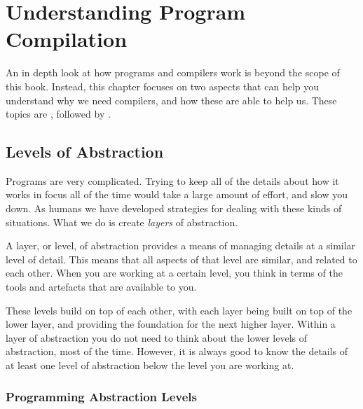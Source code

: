 

\clearpage
\def\pageLang{}
\section{Understanding Program Compilation} %
\label{sec:understanding_program_compilation}

An in depth look at how programs and compilers work is beyond the scope of this book. Instead, this chapter focuses on two aspects that can help you understand why we need compilers, and how these are able to help us. These topics are , followed by .

\subsection{Levels of Abstraction} %
\label{sub:levels_of_abstraction}

Programs are very complicated. Trying to keep all of the details about how it works in focus all of the time would take a large amount of effort, and slow you down. As humans we have developed strategies for dealing with these kinds of situations. What we do is create \emph{layers} of abstraction.

A layer, or level, of abstraction provides a means of managing details at a similar level of detail. This means that all aspects of that level are similar, and related to each other. When you are working at a certain level, you think in terms of the tools and artefacts that are available to you. 

These levels build on top of each other, with each layer being built on top of the lower layer, and providing the foundation for the next higher layer. Within a layer of abstraction you do not need to think about the lower levels of abstraction, most of the time. However, it is always good to know the details of at least one level of abstraction below the level you are working at.

\subsubsection{Programming Abstraction Levels} %
\label{ssub:programming_abstraction_levels}

